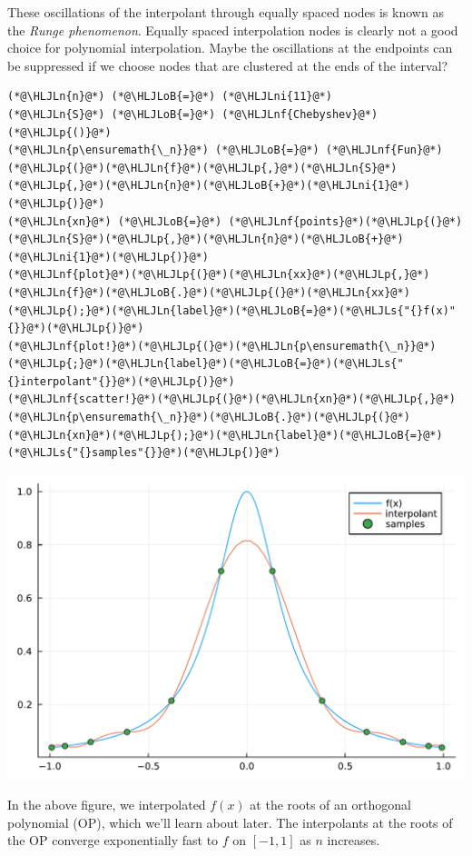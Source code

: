 \documentclass[12pt,a4paper]{article}
\newcommand{\HLJLn}[1]{#1}
\newcommand{\HLJLnf}[1]{\textcolor[RGB]{66,102,213}{#1}}
\newcommand{\HLJLs}[1]{\textcolor[RGB]{201,61,57}{#1}}
\newcommand{\HLJLni}[1]{\textcolor[RGB]{59,151,46}{#1}}
\newcommand{\HLJLoB}[1]{\textcolor[RGB]{102,102,102}{\textbf{#1}}}
\newcommand{\HLJLp}[1]{#1}
\begin{document}
These oscillations of the interpolant through equally spaced nodes is known as the \emph{Runge phenomenon}. Equally spaced interpolation nodes is clearly not a good choice for polynomial interpolation.  Maybe the oscillations at the endpoints can be suppressed if we choose nodes that are clustered at the ends of the interval?


\begin{lstlisting}
(*@\HLJLn{n}@*) (*@\HLJLoB{=}@*) (*@\HLJLni{11}@*)
(*@\HLJLn{S}@*) (*@\HLJLoB{=}@*) (*@\HLJLnf{Chebyshev}@*)(*@\HLJLp{()}@*)
(*@\HLJLn{p\ensuremath{\_n}}@*) (*@\HLJLoB{=}@*) (*@\HLJLnf{Fun}@*)(*@\HLJLp{(}@*)(*@\HLJLn{f}@*)(*@\HLJLp{,}@*)(*@\HLJLn{S}@*)(*@\HLJLp{,}@*)(*@\HLJLn{n}@*)(*@\HLJLoB{+}@*)(*@\HLJLni{1}@*)(*@\HLJLp{)}@*) 
(*@\HLJLn{xn}@*) (*@\HLJLoB{=}@*) (*@\HLJLnf{points}@*)(*@\HLJLp{(}@*)(*@\HLJLn{S}@*)(*@\HLJLp{,}@*)(*@\HLJLn{n}@*)(*@\HLJLoB{+}@*)(*@\HLJLni{1}@*)(*@\HLJLp{)}@*) 
(*@\HLJLnf{plot}@*)(*@\HLJLp{(}@*)(*@\HLJLn{xx}@*)(*@\HLJLp{,}@*)(*@\HLJLn{f}@*)(*@\HLJLoB{.}@*)(*@\HLJLp{(}@*)(*@\HLJLn{xx}@*)(*@\HLJLp{);}@*)(*@\HLJLn{label}@*)(*@\HLJLoB{=}@*)(*@\HLJLs{"{}f(x)"{}}@*)(*@\HLJLp{)}@*)
(*@\HLJLnf{plot!}@*)(*@\HLJLp{(}@*)(*@\HLJLn{p\ensuremath{\_n}}@*)(*@\HLJLp{;}@*)(*@\HLJLn{label}@*)(*@\HLJLoB{=}@*)(*@\HLJLs{"{}interpolant"{}}@*)(*@\HLJLp{)}@*)
(*@\HLJLnf{scatter!}@*)(*@\HLJLp{(}@*)(*@\HLJLn{xn}@*)(*@\HLJLp{,}@*)(*@\HLJLn{p\ensuremath{\_n}}@*)(*@\HLJLoB{.}@*)(*@\HLJLp{(}@*)(*@\HLJLn{xn}@*)(*@\HLJLp{);}@*)(*@\HLJLn{label}@*)(*@\HLJLoB{=}@*)(*@\HLJLs{"{}samples"{}}@*)(*@\HLJLp{)}@*)
\end{lstlisting}

\includegraphics[width=\linewidth]{jl_dOthw0/OP_methods_5_1.pdf}

In the above figure, we interpolated $f(x)$ at the roots of an orthogonal polynomial (OP), which we'll learn about later.  The interpolants at the roots of the OP converge exponentially fast to $f$ on $[-1, 1]$ as $n$ increases.
\end{document}
